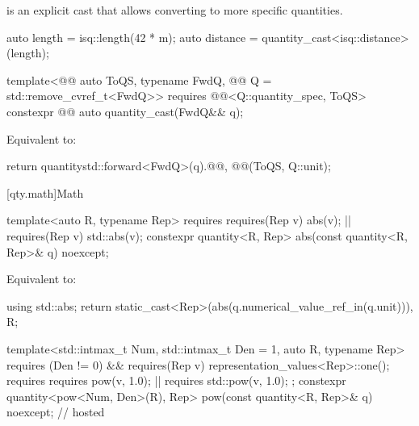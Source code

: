 \pnum
{} is an explicit cast that allows converting to more specific quantities.
\begin{example}
\begin{codeblock}
auto length = isq::length(42 * m);
auto distance = quantity_cast<isq::distance>(length);
\end{codeblock}
\end{example}

\begin{itemdecl}
template<@@ auto ToQS, typename FwdQ, @@ Q = std::remove_cvref_t<FwdQ>>
  requires @@<Q::quantity_spec, ToQS>
constexpr @@ auto quantity_cast(FwdQ&& q);
\end{itemdecl}

\begin{itemdescr}
\pnum
\effects
Equivalent to:
\begin{codeblock}
return quantity{std::forward<FwdQ>(q).@@, @@(ToQS, Q::unit)};
\end{codeblock}
\end{itemdescr}

[qty.math]{Math}

\begin{itemdecl}
template<auto R, typename Rep>
  requires requires(Rep v) { abs(v); } || requires(Rep v) { std::abs(v); }
constexpr quantity<R, Rep> abs(const quantity<R, Rep>& q) noexcept;
\end{itemdecl}

\begin{itemdescr}
\pnum
\effects
Equivalent to:
\begin{codeblock}
using std::abs;
return {static_cast<Rep>(abs(q.numerical_value_ref_in(q.unit))), R};
\end{codeblock}
\end{itemdescr}

\begin{itemdecl}
template<std::intmax_t Num, std::intmax_t Den = 1, auto R, typename Rep>
  requires (Den != 0) && requires(Rep v) {
    representation_values<Rep>::one();
    requires requires { pow(v, 1.0); } || requires { std::pow(v, 1.0); };
  }
constexpr quantity<pow<Num, Den>(R), Rep> pow(const quantity<R, Rep>& q) noexcept;      // hosted
\end{itemdecl}

